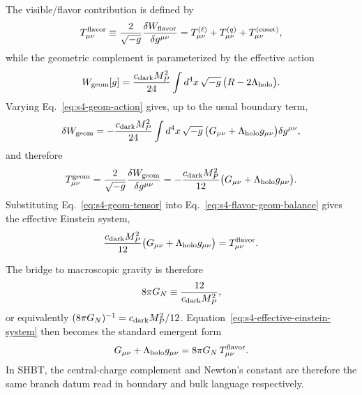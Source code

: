 \documentclass[11pt]{article}
\begin{document}
The visible/flavor contribution is defined by
\begin{equation}
\label{eq:s4-flavor-tensor}
 T_{\mu\nu}^{\rm flavor}
 \equiv
 \frac{2}{\sqrt{-g}}\frac{\delta W_{\rm flavor}}{\delta g^{\mu\nu}}
 =
 T_{\mu\nu}^{(\ell)}+T_{\mu\nu}^{(q)}+T_{\mu\nu}^{\rm(coset)},
\end{equation}
while the geometric complement is parameterized by the effective action
\begin{equation}
\label{eq:s4-geom-action}
 W_{\rm geom}[g]
 =
 \frac{c_{\rm dark} M_P^2}{24}
 \int d^4x\,\sqrt{-g}\,\bigl(R-2\Lambda_{\rm holo}\bigr).
\end{equation}
Varying Eq.~\eqref{eq:s4-geom-action} gives, up to the usual boundary term,
\begin{equation}
\label{eq:s4-geom-variation}
 \delta W_{\rm geom}
 =
 -\frac{c_{\rm dark} M_P^2}{24}
 \int d^4x\,\sqrt{-g}\,
 \bigl(G_{\mu\nu}+\Lambda_{\rm holo}g_{\mu\nu}\bigr)
 \delta g^{\mu\nu},
\end{equation}
and therefore
\begin{equation}
\label{eq:s4-geom-tensor}
 T_{\mu\nu}^{\rm geom}
 =
 \frac{2}{\sqrt{-g}}\frac{\delta W_{\rm geom}}{\delta g^{\mu\nu}}
 =
 -\frac{c_{\rm dark} M_P^2}{12}\bigl(G_{\mu\nu}+\Lambda_{\rm holo}g_{\mu\nu}\bigr).
\end{equation}
Substituting Eq.~\eqref{eq:s4-geom-tensor} into Eq.~\eqref{eq:s4-flavor-geom-balance}
gives the effective Einstein system,
\begin{equation}
\label{eq:s4-effective-einstein-system}
 \frac{c_{\rm dark} M_P^2}{12}
 \bigl(G_{\mu\nu}+\Lambda_{\rm holo}g_{\mu\nu}\bigr)
 =
 T_{\mu\nu}^{\rm flavor}.
\end{equation}

The bridge to macroscopic gravity is therefore
\begin{equation}
\label{eq:s4-effective-newton-constant}
 8\pi G_N
 \equiv
 \frac{12}{c_{\rm dark} M_P^2},
\end{equation}
or equivalently $(8\pi G_N)^{-1}=c_{\rm dark}M_P^2/12$. Equation~\eqref{eq:s4-effective-einstein-system}
then becomes the standard emergent form
\begin{equation}
\label{eq:s4-standard-efe-form}
 G_{\mu\nu}+\Lambda_{\rm holo}g_{\mu\nu}
 =
 8\pi G_N\,T_{\mu\nu}^{\rm flavor}.
\end{equation}
In SHBT, the central-charge complement and Newton's constant are therefore the
same branch datum read in boundary and bulk language respectively.
\end{document}
